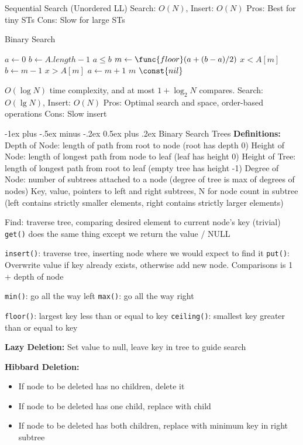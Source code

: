 \documentclass[letterpaper, 8pt]{extarticle}
\makeatletter
\renewcommand{\section}{\@startsection{section}{1}{0mm}%
                                {-1ex plus -.5ex minus -.2ex}%
                                {0.5ex plus .2ex}%
                                {\normalfont\normalsize\bfseries}}
\makeatother
\begin{document}
\begin{multicols*}{5}
  Sequential Search (Unordered LL)
  Search: $O(N)$, Insert: $O(N)$
  Pros: Best for tiny STs
  Cons: Slow for large STs

  Binary Search
  \begin{codebox}
    \li $a \gets 0$ 
    \li $b \gets A.length - 1$ 
    \li \While $a \leq b$
    \li   \Do $m \gets \func{floor}(a + (b - a) / 2)$
    \li     \If $x < A[m]$
    \li       \Do $b \gets m - 1$
    \li     \ElseIf $x > A[m]$
    \li       \Do $a \gets m + 1$
    \li     \Else \Return $m$
            \End
        \End
    \li \Return $\const{nil}$
  \end{codebox}
  $O(\log N)$ time complexity, and at most $1 + \log_2 N$ compares.
  Search: $O(\lg N)$, Insert: $O(N)$
  Pros: Optimal search and space, order-based operations
  Cons: Slow insert

  \section{Binary Search Trees}
  \textbf{Definitions:}
  Depth of Node: length of path from root to node (root has depth 0)
  Height of Node: length of longest path from node to leaf (leaf has height 0)
  Height of Tree: length of longest path from root to leaf (empty tree has height -1)
  Degree of Node: number of subtrees attached to a node (degree of tree is max of degrees of nodes)
  Key, value, pointers to left and right subtrees, N for node count in subtree (left contains strictly smaller elements, right contains strictly larger elements)

  Find: traverse tree, comparing desired element to current node's key (trivial)
  \verb|get()| does the same thing except we return the value / NULL

  \verb|insert()|: traverse tree, inserting node where we would expect to find it
  \verb|put()|: Overwrite value if key already exists, otherwise add new node. Comparisons is 1 + depth of node
  
  \verb|min()|: go all the way left
  \verb|max()|: go all the way right

  \verb|floor()|: largest key less than or equal to key
  \verb|ceiling()|: smallest key greater than or equal to key

  \textbf{Lazy Deletion:} Set value to null, leave key in tree to guide search
  
  \textbf{Hibbard Deletion:}
  \begin{itemize}
    \item If node to be deleted has no children, delete it
    \item If node to be deleted has one child, replace with child
    \item If node to be deleted has both children, replace with minimum key in right subtree
  \end{itemize}



\end{multicols*}
\end{document}
